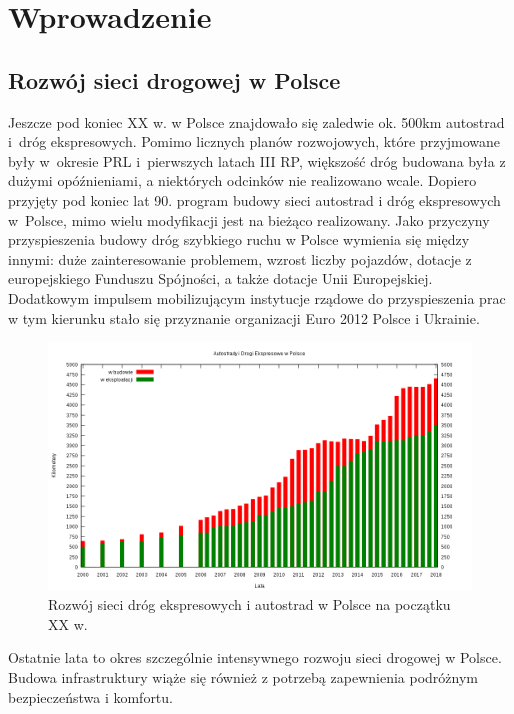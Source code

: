 \chapter{Wprowadzenie}
\section{Rozwój sieci drogowej w Polsce}

Jeszcze pod koniec XX w. w Polsce znajdowało się zaledwie ok. 500km autostrad i~dróg ekspresowych. Pomimo licznych planów rozwojowych, które przyjmowane były w~okresie PRL i~pierwszych latach III RP, większość dróg budowana była z dużymi opóźnieniami, a niektórych odcinków nie realizowano wcale.\newline
Dopiero przyjęty pod koniec lat 90. program budowy sieci autostrad i dróg ekspresowych w~Polsce, mimo wielu modyfikacji jest na bieżąco realizowany. Jako przyczyny\cite{siec-drogowa-IIIrp} przyspieszenia budowy dróg szybkiego ruchu w Polsce wymienia się między innymi: duże zainteresowanie problemem, wzrost liczby pojazdów, dotacje z europejskiego Funduszu Spójności, a także dotacje Unii Europejskiej. Dodatkowym impulsem mobilizującym instytucje rządowe do przyspieszenia prac w tym kierunku stało się przyznanie organizacji Euro 2012 Polsce i Ukrainie.\newline
\begin{figure}[h]
\caption{Rozwój sieci dróg ekspresowych i autostrad w Polsce na początku XX w.}
\includegraphics[width=\textwidth]{images/1024px-PL-Motorways.png}
\end{figure} \newline
Ostatnie lata to okres szczególnie intensywnego rozwoju sieci drogowej w Polsce. Budowa infrastruktury wiąże się również z potrzebą zapewnienia podróżnym bezpieczeństwa i komfortu.
